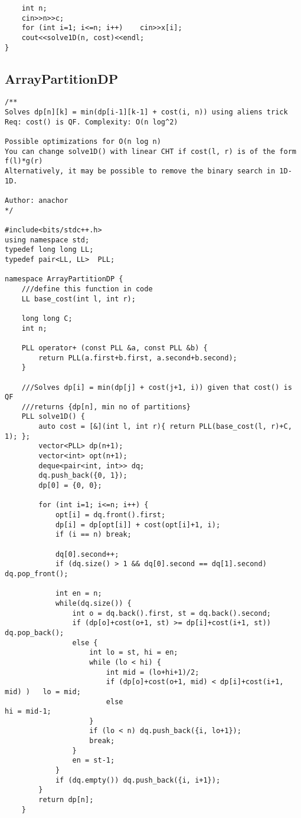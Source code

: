 \documentclass[FSZ,a4paper,onesided]{article}
\begin{document}
\begin{multicols*}{\COLS}
\begin{lstlisting}
    int n;
    cin>>n>>c;
    for (int i=1; i<=n; i++)    cin>>x[i];
    cout<<solve1D(n, cost)<<endl;
}
\end{lstlisting}
\subsection{ArrayPartitionDP}
\begin{lstlisting}
/**
Solves dp[n][k] = min(dp[i-1][k-1] + cost(i, n)) using aliens trick
Req: cost() is QF. Complexity: O(n log^2)

Possible optimizations for O(n log n)
You can change solve1D() with linear CHT if cost(l, r) is of the form f(l)*g(r)
Alternatively, it may be possible to remove the binary search in 1D-1D.

Author: anachor
*/

#include<bits/stdc++.h>
using namespace std;
typedef long long LL;
typedef pair<LL, LL>  PLL;

namespace ArrayPartitionDP {
    ///define this function in code
    LL base_cost(int l, int r);

    long long C;
    int n;

    PLL operator+ (const PLL &a, const PLL &b) {
        return PLL(a.first+b.first, a.second+b.second);
    }

    ///Solves dp[i] = min(dp[j] + cost(j+1, i)) given that cost() is QF
    ///returns {dp[n], min no of partitions}
    PLL solve1D() {
        auto cost = [&](int l, int r){ return PLL(base_cost(l, r)+C, 1); };
        vector<PLL> dp(n+1);
        vector<int> opt(n+1);
        deque<pair<int, int>> dq;
        dq.push_back({0, 1});
        dp[0] = {0, 0};

        for (int i=1; i<=n; i++) {
            opt[i] = dq.front().first;
            dp[i] = dp[opt[i]] + cost(opt[i]+1, i);
            if (i == n) break;

            dq[0].second++;
            if (dq.size() > 1 && dq[0].second == dq[1].second)  dq.pop_front();

            int en = n;
            while(dq.size()) {
                int o = dq.back().first, st = dq.back().second;
                if (dp[o]+cost(o+1, st) >= dp[i]+cost(i+1, st))  dq.pop_back();
                else {
                    int lo = st, hi = en;
                    while (lo < hi) {
                        int mid = (lo+hi+1)/2;
                        if (dp[o]+cost(o+1, mid) < dp[i]+cost(i+1, mid) )   lo = mid;
                        else                                                hi = mid-1;
                    }
                    if (lo < n) dq.push_back({i, lo+1});
                    break;
                }
                en = st-1;
            }
            if (dq.empty()) dq.push_back({i, i+1});
        }
        return dp[n];
    }


\end{lstlisting}
\end{multicols*}
\end{document}
